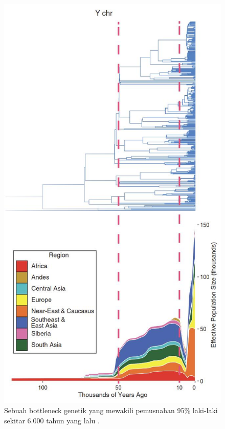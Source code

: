 \documentclass[10pt,twocolumn,letterpaper]{article}
\begin{document}
\begin{figure}[b]
\begin{center}
   \includegraphics[width=1\linewidth]{bottleneck.jpg}
\end{center}
   \caption{Sebuah bottleneck genetik yang mewakili pemusnahan 95\% laki-laki sekitar 6.000 tahun yang lalu \cite{62}.}
\label{fig:10}
\label{fig:onecol}
\end{figure}
\end{document}
